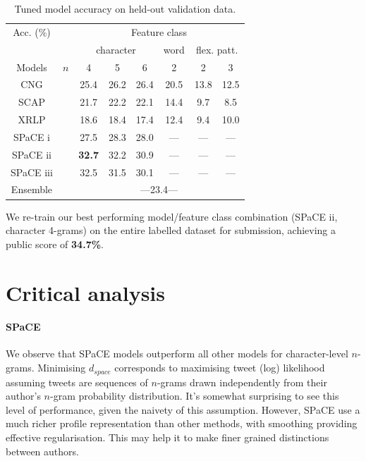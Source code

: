 \documentclass[twocolumn,10pt]{article}
\begin{document}
\begin{table}[h]
\centering
\begin{tabular}{@{}cccccccc@{}}
\cmidrule{3-8}
Acc. (\%)   &     & \multicolumn{6}{c}{Feature class}                    \\
\cmidrule{3-8} 
            &     & \multicolumn{3}{c}{character} & word  & \multicolumn{2}{c}{flex. patt.} \\
\cmidrule(r){1-1} \cmidrule(rl){3-5} \cmidrule(rl){6-6} \cmidrule(rl){7-8} 
Models      & $n$ & 4      & 5      & 6           & 2     & 2     & 3    \\
\cmidrule(r){1-1} \cmidrule{3-8} 
CNG         &     & 25.4   & 26.2   & 26.4        & 20.5  & 13.8  & 12.5 \\
SCAP        &     & 21.7   & 22.2   & 22.1        & 14.4  &  9.7  &  8.5 \\
XRLP        &     & 18.6   & 18.4   & 17.4        & 12.4  &  9.4  & 10.0 \\
SPaCE i     &     & 27.5   & 28.3   & 28.0        & ---   & ---   & ---  \\
SPaCE ii    & &{\bf 32.7}  & 32.2   & 30.9        & ---   & ---   & ---  \\
SPaCE iii   &     & 32.5   & 31.5   & 30.1        & ---   & ---   & ---  \\
                  \cmidrule{3-8} 
Ensemble    &     & \multicolumn{6}{c}{ ---23.4--- }\\ %
\bottomrule
\end{tabular}
\caption{Tuned model accuracy on held-out validation data.}
\label{tab:devresults}
\end{table}

We re-train our best performing model/feature class combination
(SPaCE ii, character 4-grams) on the entire labelled dataset for submission,
achieving a public score of \textbf{34.7\%}.

\section{Critical analysis}


\paragraph{SPaCE}
We observe that SPaCE models outperform all other models for
character-level $n$-grams.
Minimising $d_{space}$ corresponds to maximising
tweet (log) likelihood assuming tweets are sequences of
$n$-grams drawn independently from their author's $n$-gram
probability distribution.
It's somewhat surprising to see this level of performance,
given the naivety of this assumption.
However, SPaCE use a much richer profile representation
than other methods, with smoothing providing effective
regularisation. This may help it to make finer grained
distinctions between authors.
\end{document}
